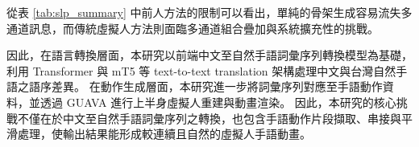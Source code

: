 \documentclass[class=NCU_thesis, crop=false]{standalone}
\begin{document}
從表 \ref{tab:slp_summary} 中前人方法的限制可以看出，單純的骨架生成容易流失多通道訊息，而傳統虛擬人方法則面臨多通道組合疊加與系統擴充性的挑戰。


因此，在語言轉換層面，本研究以前端中文至自然手語詞彙序列轉換模型為基礎，利用 Transformer 與 mT5 等 text-to-text translation 架構處理中文與台灣自然手語之語序差異。
在動作生成層面，本研究進一步將詞彙序列對應至手語動作資料，並透過 GUAVA 進行上半身虛擬人重建與動畫渲染。
因此，本研究的核心挑戰不僅在於中文至自然手語詞彙序列之轉換，也包含手語動作片段擷取、串接與平滑處理，使輸出結果能形成較連續且自然的虛擬人手語動畫。





\pagebreak
\end{document}
